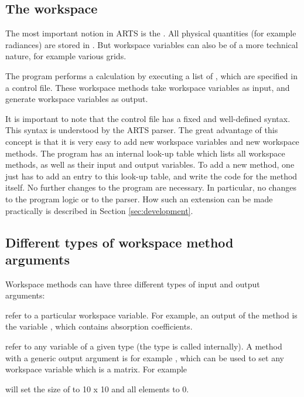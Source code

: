 \subsection{The workspace}

The most important notion in ARTS is the . All
physical quantities (for example radiances) are stored in
. But workspace variables can also be
of a more technical nature, for example various grids.

The program performs a calculation by executing a list of
, which are specified in a control file.
These workspace methods take workspace variables as input, and
generate workspace variables as output.

It is important to note that the control file has a fixed and
well-defined syntax. This syntax is understood by the ARTS parser.
The great advantage of this concept is that it is very easy to add new
workspace variables and new workspace methods. The program has an
internal look-up table which lists all workspace methods, as well as
their input and output variables. To add a new method, one just has to
add an entry to this look-up table, and write the code for the method
itself. No further changes to the program are necessary. In
particular, no changes to the program logic or to the parser. How such
an extension can be made practically is described in Section
\ref{sec:development}.



\subsection{Different types of workspace method arguments}

Workspace methods can have three different types of input and output
arguments: 

\emph{} refer to a particular workspace
variable. For example, an output of the method
 is the variable , which
contains absorption coefficients.

\emph{} refer to any variable of a given
type (the type is called 
internally).  A method with a generic output argument is for example
, which can be used to set any workspace
variable which is a matrix. For example
\begin{quote}
\end{quote}
will set the size of  to 10 x 10 and all
elements to 0.

